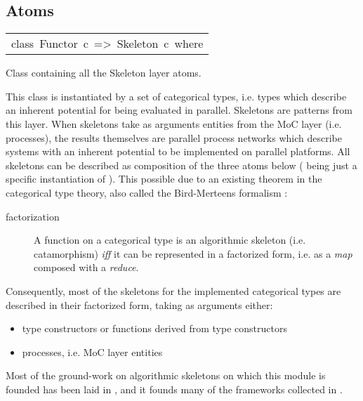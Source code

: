 \subsection{Atoms}
\begin{haddockdesc}
\item[\begin{tabular}{@{}l}
class\ Functor\ c\ =>\ Skeleton\ c\ where
\end{tabular}]\haddockbegindoc
Class containing all the Skeleton layer atoms.\par
This class is instantiated by a set of categorical types,
 i.e. types which describe an inherent potential for being evaluated
 in parallel. Skeletons are patterns from this layer. When skeletons
 take as arguments entities from the MoC layer (i.e. processes), the
 results themselves are parallel process networks which describe
 systems with an inherent potential to be implemented on parallel
 platforms. All skeletons can be described as composition of the
 three atoms below (\haddockid{=<<=} being just a specific instantiation of
 ). This possible due to an existing theorem in the categorical
 type theory, also called the Bird-Merteens formalism
 \cite{Bird97}:\par
\par
\begin{description}
\item[factorization] A function on a categorical type is an algorithmic
 skeleton (i.e. catamorphism) \emph{iff} it can be represented in a
 factorized form, i.e. as a \emph{map} composed with a \emph{reduce}.
\end{description}Consequently, most of the skeletons for the implemented categorical
 types are described in their factorized form, taking as arguments
 either:\par
                 \begin{itemize}
                 \item
                 type constructors or functions derived from type constructors\par
                 
                 \item
                 processes, i.e. MoC layer entities\par
                 
                 \end{itemize}
                 Most of the ground-work on algorithmic skeletons on which this
 module is founded has been laid in \cite{Bird97},
 \cite{Skillicorn05} and it founds many
 of the frameworks collected in \cite{Gorlatch03}.\par
                 

\end{haddockdesc}
